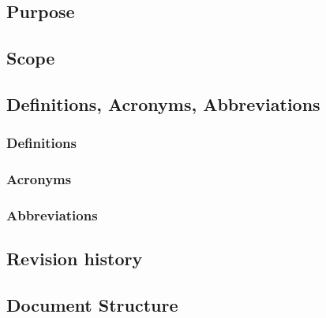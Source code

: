\subsection{Purpose}
	
\subsection{Scope}
	
\subsection{Definitions, Acronyms, Abbreviations}
	\subsubsection{Definitions}
	\subsubsection{Acronyms}
	\subsubsection{Abbreviations}
	
\subsection{Revision history}
	
\subsection{Document Structure}
